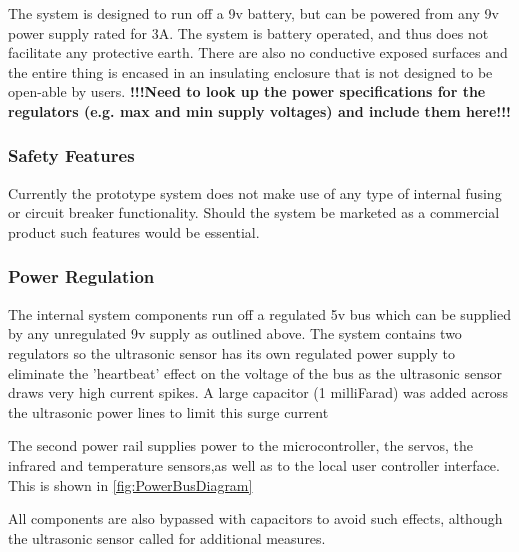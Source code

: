 \documentclass[]{report}
\begin{document}
The system is designed to run off a 9v battery, but can be powered from any 9v power supply rated for 3A. The system is battery operated, and thus does not facilitate any protective earth. There are also no conductive exposed surfaces and the entire thing is encased in an insulating enclosure that is not designed to be open-able by users. \newline
\textbf{!!!Need to look up the power specifications for the regulators (e.g. max and min supply voltages) and include them here!!!}

\subsubsection{Safety Features}
Currently the prototype system does not make use of any type of internal fusing or circuit breaker functionality. Should the system be marketed as a commercial product such features would be essential.

\subsubsection{Power Regulation}
The internal system components run off a regulated 5v bus which can be supplied by any unregulated 9v supply as outlined above. The system contains two regulators so the ultrasonic sensor has its own regulated power supply to eliminate the 'heartbeat' effect on the voltage of the bus as the ultrasonic sensor draws very high current spikes.  A large capacitor (1 milliFarad) was added across the ultrasonic power lines to limit this surge current \newline

The second power rail supplies power to the microcontroller, the servos, the infrared and temperature sensors,as well as to the local user controller interface. This is shown in \ref{fig:PowerBusDiagram}

All components are also bypassed with capacitors to avoid such effects, although the ultrasonic sensor called for additional measures.

\label{PowerBusDiagram}
\end{document}
